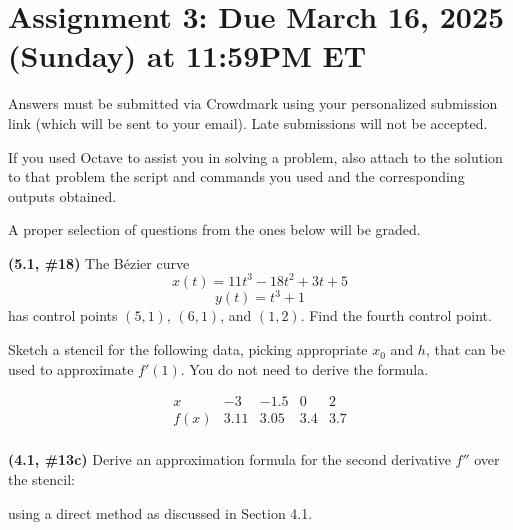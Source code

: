 \documentclass{eh-homework}
\begin{document}
\section*{Assignment 3: Due March 16, 2025 (Sunday) at 11:59PM ET}

Answers must be submitted via Crowdmark using your personalized submission link (which will be sent to your email). Late submissions will not be accepted.

If you used Octave to assist you in solving a problem, also attach to the solution to that problem the script and commands you used and the corresponding outputs obtained.

A proper selection of questions from the ones below will be graded.

\begin{question}{1}
\textbf{(5.1, \#18)} The Bézier curve
\[
x(t) = 11t^3 - 18t^2 + 3t + 5
\]
\[
y(t) = t^3 + 1
\]
has control points \((5,1)\), \((6,1)\), and \((1,2)\). Find the fourth control point.
\end{question}

\begin{question}{2}
Sketch a stencil for the following data, picking appropriate \(x_0\) and \(h\), that can be used to approximate \(f'(1)\). You do not need to derive the formula.

\[
\begin{array}{c|cccc}
x & -3 & -1.5 & 0 & 2 \\
\hline
f(x) & 3.11 & 3.05 & 3.4 & 3.7 \\
\end{array}
\]

\begin{center}
\end{center}
\end{question}

\begin{question}{3}
\textbf{(4.1, \#13c)} Derive an approximation formula for the second derivative \( f'' \) over the stencil:

\begin{center}
\end{center}

using a direct method as discussed in Section 4.1.
\end{question}
\end{document}
